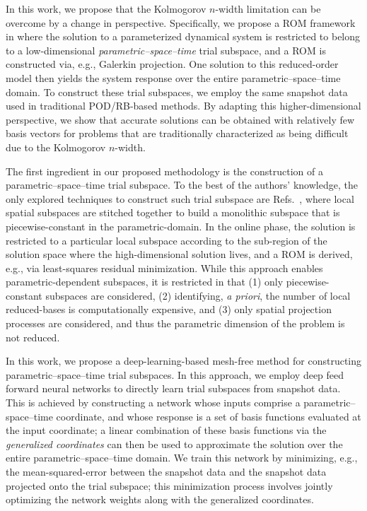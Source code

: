 \documentclass[3p,computermodern,10pt]{elsarticle}
\begin{document}
In this work, we propose that the Kolmogorov $n$-width limitation can be overcome by a change in perspective. Specifically, we propose a ROM framework in where the solution to a parameterized dynamical system is restricted to belong to a low-dimensional \textit{parametric--space--time} trial subspace, and a ROM is constructed via, e.g., Galerkin projection.  One solution to this reduced-order model then yields the system response over the entire parametric--space--time domain. To construct these trial subspaces, we employ the same snapshot data used in traditional POD/RB-based methods. By adapting this higher-dimensional perspective, we show that accurate solutions can be obtained with relatively few basis vectors for problems that are traditionally characterized as being difficult due to the Kolmogorov $n$-width. 

The first ingredient in our proposed methodology is the construction of a parametric--space--time trial subspace. To the best of the authors' knowledge, the only explored techniques to construct such trial subspace are Refs.~\cite{}, where local spatial subspaces are stitched together to build a monolithic subspace that is piecewise-constant in the parametric-domain. In the online phase, the solution is restricted to a particular local subspace according to the sub-region of the solution space where the high-dimensional solution lives, and a ROM is derived, e.g., via least-squares residual minimization. While this approach enables parametric-dependent subspaces, it is restricted in that (1) only piecewise-constant subspaces are considered, (2) identifying, \textit{a priori}, the number of local reduced-bases is computationally expensive, and (3) only spatial projection processes are considered, and thus the parametric dimension of the problem is not reduced. 

In this work, we propose a deep-learning-based mesh-free method for constructing parametric--space--time trial subspaces. In this approach, we employ deep feed forward neural networks to directly learn trial subspaces from snapshot data. This is achieved by constructing a network whose inputs comprise a parametric--space--time coordinate, and whose response is a set of basis functions evaluated at the input coordinate; a linear combination of these basis functions via the \textit{generalized coordinates} can then be used to approximate the solution over the entire parametric--space--time domain. We train this network by minimizing, e.g., the mean-squared-error between the snapshot data and the snapshot data projected onto the trial subspace; this minimization process involves jointly optimizing the network weights along with the generalized coordinates.
\end{document}
